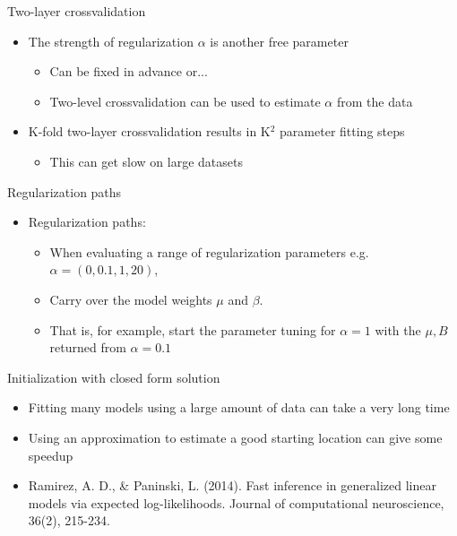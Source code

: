 \documentclass[svgnames,13pt,handout]{beamer}
\begin{document}
\begin{frame}{Two-layer crossvalidation}
\begin{itemize}
	\item <1->The strength of regularization $\alpha$ is another free parameter
	\begin{itemize}
		\item Can be fixed in advance or...
		\item <2->Two-level crossvalidation can be used to estimate $\alpha$ from the data
		\end{itemize}
	\item <3->K-fold two-layer crossvalidation results in K${}^2$ parameter fitting steps
	\begin{itemize}
		\item This can get slow on large datasets
	\end{itemize}
\end{itemize}
\end{frame} 

\begin{frame}{Regularization paths}
\begin{itemize}
	\item Regularization paths:
	\begin{itemize}
		\item When evaluating a range of regularization parameters e.g. $\alpha=(0,0.1,1,20)$,
		\item Carry over the model weights $\mu$ and $\beta$. 
		\item That is, for example, start the parameter tuning for $\alpha=1$ with the $\mu,B$ returned from $\alpha=0.1$
	\end{itemize}
\end{itemize}
\end{frame} 

\begin{frame}{Initialization with closed form solution}
\begin{itemize}
	\item <1->Fitting many models using a large amount of data can take a very long time
	\item <2->Using an approximation to estimate a good starting location can give some speedup
	\item <2->Ramirez, A. D., \& Paninski, L. (2014). Fast inference in generalized linear models via expected log-likelihoods. Journal of computational neuroscience, 36(2), 215-234.
\end{itemize}
\end{frame} 
\end{document}
